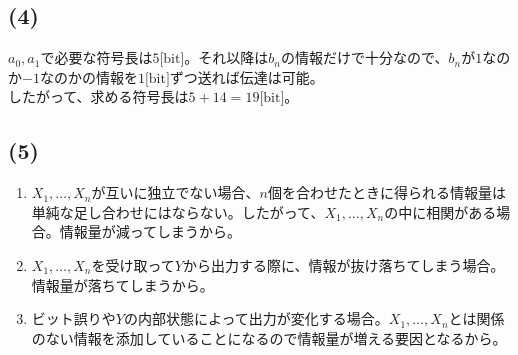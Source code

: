 \documentclass[a4paper,12pt,xelatex,ja=standard]{bxjsarticle}
\begin{document}
\subsection*{(4)}
$a_0, a_1$で必要な符号長は$5 \text{[bit]}$。それ以降は$b_n$の情報だけで十分なので、$b_n$が$1$なのか$-1$なのかの情報を$1 \text{[bit]}$ずつ送れば伝達は可能。\\
したがって、求める符号長は$5 + 14 = 19\text{[bit]}$。

\subsection*{(5)}
\begin{enumerate}
  \item $X_1, \dots, X_n$が互いに独立でない場合、$n$個を合わせたときに得られる情報量は単純な足し合わせにはならない。したがって、$X_1, \dots, X_n$の中に相関がある場合。情報量が減ってしまうから。
  \item $X_1, \dots, X_n$を受け取って$Y$から出力する際に、情報が抜け落ちてしまう場合。情報量が落ちてしまうから。
  \item ビット誤りや$Y$の内部状態によって出力が変化する場合。$X_1, \dots, X_n$とは関係のない情報を添加していることになるので情報量が増える要因となるから。
\end{enumerate}
\end{document}
